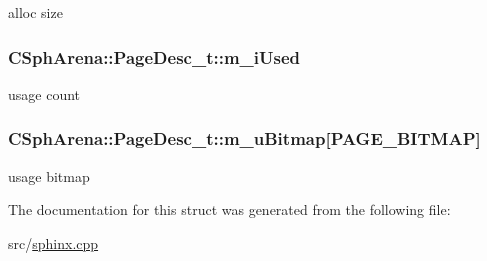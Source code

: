 alloc size 

\hypertarget{structCSphArena_1_1PageDesc__t_a98788ffeb0561573976d2c3cd81b5273}{
\subsubsection[{m\-\_\-i\-Used}]{ C\-Sph\-Arena\-::\-Page\-Desc\-\_\-t\-::m\-\_\-i\-Used}}\label{structCSphArena_1_1PageDesc__t_a98788ffeb0561573976d2c3cd81b5273}


usage count 

\hypertarget{structCSphArena_1_1PageDesc__t_a4fbc9e63a872d985884e421ca501719d}{
\subsubsection[{m\-\_\-u\-Bitmap}]{ C\-Sph\-Arena\-::\-Page\-Desc\-\_\-t\-::m\-\_\-u\-Bitmap\mbox{[}{\bf P\-A\-G\-E\-\_\-\-B\-I\-T\-M\-A\-P}\mbox{]}}}\label{structCSphArena_1_1PageDesc__t_a4fbc9e63a872d985884e421ca501719d}


usage bitmap 



The documentation for this struct was generated from the following file\-:\begin{DoxyCompactItemize}
\item 
src/\hyperlink{sphinx_8cpp}{sphinx.\-cpp}\end{DoxyCompactItemize}
